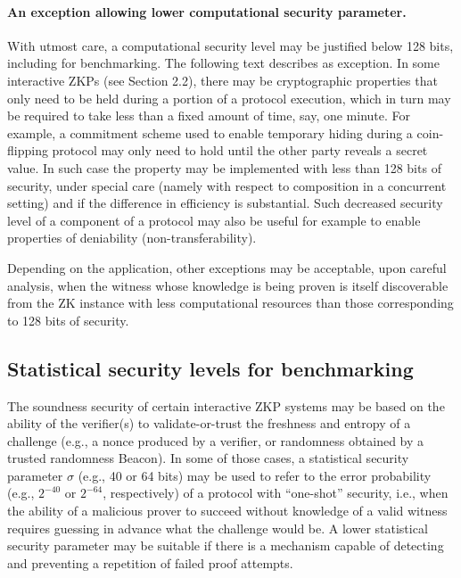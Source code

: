 \paragraph{An exception allowing lower computational security parameter.}
\label{par:security:efficiency:comp-sec-levels:exception}
	With utmost care, a computational security level may be justified below 128 bits, including for benchmarking.
	The following text describes as exception.
	In some interactive ZKPs (see Section 2.2), there may be cryptographic properties that only need to be held during a portion of a protocol execution, which in turn may be required to take less than a fixed amount of time, say, one minute.
	For example, a commitment scheme used to enable temporary hiding during a coin-flipping protocol may only need to hold until the other party reveals a secret value.
	In such case the property may be implemented with less than 128 bits of security, under special care (namely with respect to composition in a concurrent setting) and if the difference in efficiency is substantial.
	Such decreased security level of a component of a protocol may also be useful for example to enable properties of deniability (non-transferability).

    Depending on the application, other exceptions may be acceptable, upon careful analysis, when the witness whose knowledge is being proven is itself discoverable from the ZK instance with less computational resources than those corresponding to 128 bits of security. 



\def\tmpTitle{Statistical security levels for benchmarking}
\subsection[\tmpTitle]{\tmpTitle{}}
\label{security:efficiency:stat-sec-levels}


	The soundness security of certain interactive ZKP systems may be based on the ability of the verifier(s) to validate-or-trust the freshness and entropy of a challenge (e.g., a nonce produced by a verifier, or randomness obtained by a trusted randomness Beacon).
	In some of those cases, a statistical security parameter $\sigma$ (e.g., 40 or 64 bits) may be used to refer to the error probability (e.g., $2^{-40}$ or $2^{-64}$, respectively) of a protocol with ``one-shot'' security, i.e., when the ability of a malicious prover to succeed without knowledge of a valid witness requires guessing in advance what the challenge would be.
	A lower statistical security parameter may be suitable if there is a mechanism capable of detecting and preventing a repetition of failed proof attempts.

